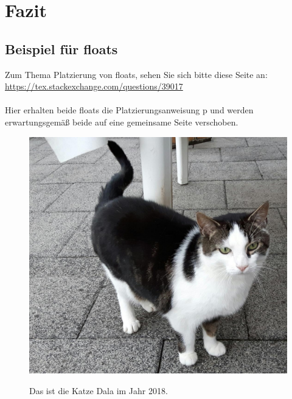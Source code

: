 \chapter{Fazit}

\section{Beispiel für floats}

Zum Thema Platzierung von floats, sehen Sie sich bitte diese Seite an:\\
\url{https://tex.stackexchange.com/questions/39017}\\
\ \\
Hier erhalten beide floats die Platzierungsanweisung p und werden erwartungsgemäß beide auf eine gemeinsame Seite verschoben.

\Blindtext

\begin{figure}[p]
\centering
\includegraphics[scale=0.5]{img/Dala}
\label{figDala}
\caption[Kurztitel Katze]{Das ist die Katze Dala im Jahr 2018.}
\end{figure}

